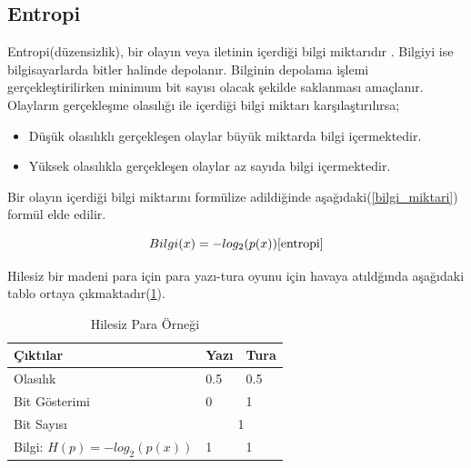 \documentclass[12pt, a4paper]{article}
\begin{document}
			
			\subsection{Entropi} 	
			Entropi(düzensizlik), bir olayın veya iletinin içerdiği bilgi miktarıdır \cite{entropi}. Bilgiyi ise bilgisayarlarda bitler halinde depolanır. Bilginin depolama işlemi gerçekleştirilirken minimum bit sayısı olacak şekilde saklanması amaçlanır. Olayların gerçekleşme olasılığı ile içerdiği bilgi miktarı karşılaştırılırsa;
			
			\begin{itemize}
				\item Düşük olasılıklı gerçekleşen olaylar büyük miktarda bilgi içermektedir.
				\item  Yüksek olasılıkla gerçekleşen olaylar az sayıda bilgi içermektedir.
			\end{itemize}
			
			Bir olayın içerdiği bilgi miktarını formülize adildiğinde aşağıdaki(\ref{bilgi_miktari}) formül elde edilir.
			
			\begin {center}
				\begin{equation}
					Bilgi(x) = -log_2(p(x))
					\label{eqn: bilgi_miktari}\cite{entropi}
				\end{equation}
			\end {center}
			
			\vspace*{1\baselineskip}
			Hilesiz bir madeni para için para yazı-tura oyunu için havaya atıldğında aşağıdaki tablo ortaya çıkmaktadır(\ref{tab:Tablo1}).
		
		
			\begin{table}[htbp]
				\begin {center}
				\caption{Hilesiz Para Örneği \cite{entropi}}	\label{tab:Tablo1}
				
				\begin{tabular}{|l|l|l|}
					\hline
					Çıktılar & Yazı & Tura \\
					\hline
					Olasılık & 0.5 & 0.5 \\
					\hline
					Bit Gösterimi & 0 & 1 \\
					\hline
					Bit Sayısı & \multicolumn{2}{|c|}{1} \\
					\hline
					Bilgi: $H(p)= -log_2(p(x))$	& 1 & 1 \\
					\hline 
				\end{tabular}
				\vspace*{1\baselineskip}
				\end {center}
			\end{table}
		
\end{document}
